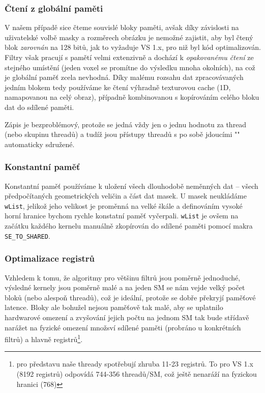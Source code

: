         \subsubsection{Čtení z globální paměti}\label{globální pam opt}
        
        V našem případě sice čteme souvislé bloky paměti, avšak díky závislosti na uživatelské volbě masky a rozměrech obrázku je nemožné zajistit, aby byl čtený blok \emph{zarovnán} na 128 bitů, jak to vyžaduje VS 1.x, pro niž byl kód optimalizován. Filtry však pracují s pamětí velmi extenzivně a dochází k \emph{opakovanému čtení} ze stejného umístění (jeden voxel se promítne do výsledku mnoha okolních), na což je globální paměť zcela nevhodná. Díky malému rozsahu dat zpracovávaných jedním blokem tedy používáme ke čtení výhradně texturovou cache (1D, namapovanou na celý obraz), případně kombinovanou s kopírováním celého bloku dat do sdílené paměti.
        
        Zápis je bezproblémový, protože se jedná vždy jen o jednu hodnotu za thread (nebo skupinu threadů) a tudíž jsou přístupy threadů s po sobě jdoucími \Vr"" automaticky sdružené.

        \subsubsection{Konstantní paměť}

        Konstantní paměť používáme k uložení všech dlouhodobě neměnných dat -- všech předpočítaných geometrických veličin a část dat masek. U masek neukládáme {\tt wList}, jelikož jeho velikost je proměnná na velké škále a definováním vysoké horní hranice bychom rychle konstatní paměť vyčerpali. {\tt wList} je ovšem na začátku každého kernelu manuálně zkopírován do sdílené paměti pomocí makra {\tt SE\_TO\_SHARED}.
        
        \subsubsection{Optimalizace registrů}
        
        Vzhledem k tomu, že algoritmy pro většinu filtrů jsou poměrně jednoduché, výsledné kernely jsou poměrně malé a na jeden SM se nám vejde velký počet bloků (nebo alespoň threadů), což je ideální, protože se dobře překryjí paměťové latence. Bloky ale bohužel nejsou paměťově tak malé, aby se uplatnilo hardwarové omezení a zvyšování jejich počtu na jednom SM tak bude střídavě narážet na fyzické omezení množsví sdílené paměti (probráno u konkrétních filtrů) a hlavně registrů\footnote{pro představu naše thready spotřebují zhruba 11-23 registrů. To pro VS 1.x (8192 registrů) odpovídá 744-356 threadů/SM, což ještě nenaráží na fyzickou hranici (768)}.
        

